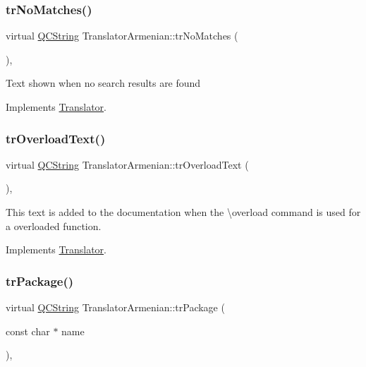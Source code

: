 \mbox{\label{class_translator_armenian_af16ff10c1579eeaed8643b654223b59e}} 
\subsubsection{\texorpdfstring{trNoMatches()}{trNoMatches()}}
{\footnotesize\ttfamily virtual \mbox{\hyperlink{class_q_c_string}{Q\+C\+String}} Translator\+Armenian\+::tr\+No\+Matches (\begin{DoxyParamCaption}{ }\end{DoxyParamCaption})\hspace{0.3cm}{\ttfamily [inline]}, {\ttfamily [virtual]}}

Text shown when no search results are found 

Implements \mbox{\hyperlink{class_translator}{Translator}}.

\mbox{\label{class_translator_armenian_a4c071bc3947a5ee1c32c3cb6a7266682}} 
\subsubsection{\texorpdfstring{trOverloadText()}{trOverloadText()}}
{\footnotesize\ttfamily virtual \mbox{\hyperlink{class_q_c_string}{Q\+C\+String}} Translator\+Armenian\+::tr\+Overload\+Text (\begin{DoxyParamCaption}{ }\end{DoxyParamCaption})\hspace{0.3cm}{\ttfamily [inline]}, {\ttfamily [virtual]}}

This text is added to the documentation when the \textbackslash{}overload command is used for a overloaded function. 

Implements \mbox{\hyperlink{class_translator}{Translator}}.

\mbox{\label{class_translator_armenian_afdea012ba806786feff8353350462ff0}} 
\subsubsection{\texorpdfstring{trPackage()}{trPackage()}}
{\footnotesize\ttfamily virtual \mbox{\hyperlink{class_q_c_string}{Q\+C\+String}} Translator\+Armenian\+::tr\+Package (\begin{DoxyParamCaption}\item[{const char $\ast$}]{name }\end{DoxyParamCaption})\hspace{0.3cm}{\ttfamily [inline]}, {\ttfamily [virtual]}}

